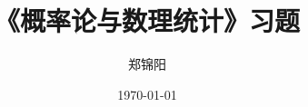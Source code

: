 \documentclass{ctexart}
\numberwithin{equation}{section}                    %
\begin{document}
\title{《概率论与数理统计》习题}
\author{郑锦阳}
\date{\today}
\maketitle
\tableofcontents








\end{document}
